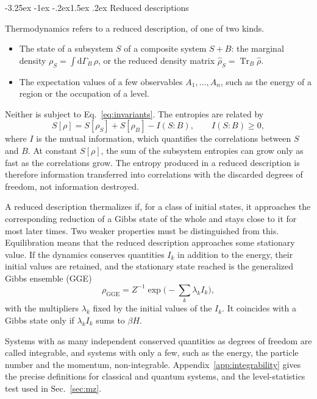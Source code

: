 \documentclass[10pt,a4paper]{article}
\makeatletter
\renewcommand{\subsection}{\@startsection{subsection}{2}{\z@}%
  {-3.25ex \@plus -1ex \@minus -.2ex}{1.5ex \@plus .2ex}%
  {\normalfont\fontsize{15.5pt}{19pt}\selectfont\bfseries}}
\newcommand{\dd}{\mathrm{d}}
\newcommand{\Tr}{\operatorname{Tr}}
\makeatother
\begin{document}
\subsection{Reduced descriptions}

Thermodynamics refers to a reduced description, of one of two kinds.
\begin{itemize}[leftmargin=1.5em]
\item The state of a subsystem $ S $ of a composite system $ S + B $: the marginal density $ \rho_S = \int \dd\Gamma_B \, \rho $, or the reduced density matrix $ \hat\rho_S = \Tr_B \hat\rho $.
\item The expectation values of a few observables $ A_1, \dots, A_n $, such as the energy of a region or the occupation of a level.
\end{itemize}
Neither is subject to Eq.~\eqref{eq:invariants}.
The entropies are related by
\begin{equation}
  S[\rho] = S[\rho_S] + S[\rho_B] - I(S\!:\!B) ,
  \qquad I(S\!:\!B) \ge 0 ,
  \label{eq:mutual}
\end{equation}
where $ I $ is the mutual information, which quantifies the correlations between $ S $ and $ B $.
At constant $ S[\rho] $, the sum of the subsystem entropies can grow only as fast as the correlations grow.
The entropy produced in a reduced description is therefore information transferred into correlations with the discarded degrees of freedom, not information destroyed.

A reduced description thermalizes if, for a class of initial states, it approaches the corresponding reduction of a Gibbs state of the whole and stays close to it for most later times.
Two weaker properties must be distinguished from this.
Equilibration means that the reduced description approaches some stationary value.
If the dynamics conserves quantities $ I_k $ in addition to the energy, their initial values are retained, and the stationary state reached is the generalized Gibbs ensemble (GGE)~\cite{Rigol2007}
\begin{equation}
  \rho_{\mathrm{GGE}} = Z^{-1} \exp\Big( - \sum_k \lambda_k I_k \Big) ,
  \label{eq:gge}
\end{equation}
with the multipliers $ \lambda_k $ fixed by the initial values of the $ I_k $.
It coincides with a Gibbs state only if $ \lambda_k I_k $ sums to $ \beta H $.

Systems with as many independent conserved quantities as degrees of freedom are called integrable, and systems with only a few, such as the energy, the particle number and the momentum, non-integrable.
Appendix~\ref{app:integrability} gives the precise definitions for classical and quantum systems, and the level-statistics test used in Sec.~\ref{sec:mz}.
\end{document}
